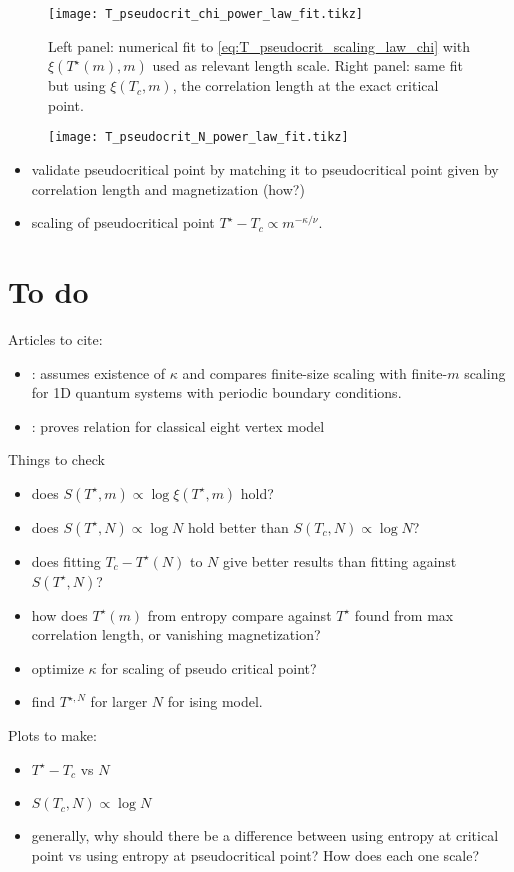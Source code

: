\begin{figure}
  \texttt{[image: T\_pseudocrit\_chi\_power\_law\_fit.tikz]}
  \caption{Left panel: numerical fit to \autoref{eq:T_pseudocrit_scaling_law_chi} with $\xi(T^{\star}(m), m)$ used as
  relevant length scale. Right panel: same fit but using $\xi(T_c, m)$, the correlation length at the exact critical
  point.}\label{fig:T_pseudocrit_chi_power_law_fit}
\end{figure}

\begin{figure}
  \texttt{[image: T\_pseudocrit\_N\_power\_law\_fit.tikz]}
  \caption{}\label{fig:T_pseudocrit_N_power_law_fit}
\end{figure}


\begin{itemize}
  \item validate pseudocritical point by matching it to pseudocritical point given by correlation length and
  magnetization (how?)
  \item scaling of pseudocritical point $T^{\star} - T_c \propto m^{-\kappa / \nu}$.
\end{itemize}

\section{To do}

Articles to cite:

\begin{itemize}
\item \cite{pirvu2012matrix}: assumes existence of $\kappa$ and compares finite-size scaling with finite-$m$ scaling
for 1D quantum systems with periodic boundary conditions.
\item \cite{ercolessi2010exact}: proves relation for classical eight vertex model
\end{itemize}

Things to check

\begin{itemize}
  \item does $S(T^{\star}, m) \propto \log \xi(T^{\star}, m)$ hold?
  \item does $S(T^{\star}, N) \propto \log N$ hold better than $S(T_c, N) \propto \log N$?
  \item does fitting $T_c - T^{\star}(N)$ to $N$ give better results than fitting against
  $S(T^{\star}, N)$?
  \item how does $T^{\star}(m)$ from entropy compare against $T^{\star}$ found from max correlation length, or
  vanishing magnetization?
  \item optimize $\kappa$ for scaling of pseudo critical point?
  \item find $T^{\star, N}$ for larger $N$ for ising model.

\end{itemize}

Plots to make:

\begin{itemize}
  \item $T^{\star} - T_c$ vs $N$
  \item $S(T_c, N) \propto \log N$
  \item generally, why should there be a difference between using entropy at critical point
  vs using entropy at pseudocritical point? How does each one scale?
\end{itemize}
